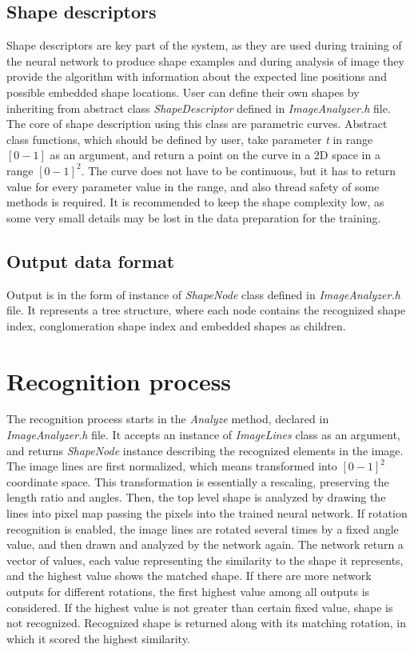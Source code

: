 \subsection{Shape descriptors}
Shape descriptors are key part of the system, as they are used during training of the neural network to produce shape examples and during analysis of image they provide the algorithm with information about the expected line positions and possible embedded shape locations. User can define their own shapes by inheriting from abstract class \emph{ShapeDescriptor} defined in \emph{ImageAnalyzer.h} file. The core of shape description using this class are parametric curves. Abstract class functions, which should be defined by user, take parameter \emph{t} in range $[0-1]$ as an argument, and return a point on the curve in a 2D space in a range $[0-1]^2$. The curve does not have to be continuous, but it has to return value for every parameter value in the range, and also thread safety of some methods is required. It is recommended to keep the shape complexity low, as some very small details may be lost in the data preparation for the training. 

\subsection{Output data format}
Output is in the form of instance of \emph{ShapeNode} class defined in \emph{ImageAnalyzer.h} file. It represents a tree structure, where each node contains the recognized shape index, conglomeration shape index and embedded shapes as children.

\section{Recognition process}
The recognition process starts in the \emph{Analyze} method, declared in \emph{ImageAnalyzer.h} file. It accepts an instance of \emph{ImageLines} class as an argument, and returns \emph{ShapeNode} instance describing the recognized elements in the image. The image lines are first normalized, which means transformed into $[0-1]^2$ coordinate space. This transformation is essentially a rescaling, preserving the length ratio and angles. Then, the top level shape is analyzed by drawing the lines into pixel map passing the pixels into the trained neural network. If rotation recognition is enabled, the image lines are rotated several times by a fixed angle value, and then drawn and analyzed by the network again. The network return a vector of values, each value representing the similarity to the shape it represents, and the highest value shows the matched shape. If there are more network outputs for different rotations, the first highest value among all outputs is considered. If the highest value is not greater than certain fixed value, shape is not recognized. Recognized shape is returned along with its matching rotation, in which it scored the highest similarity.

